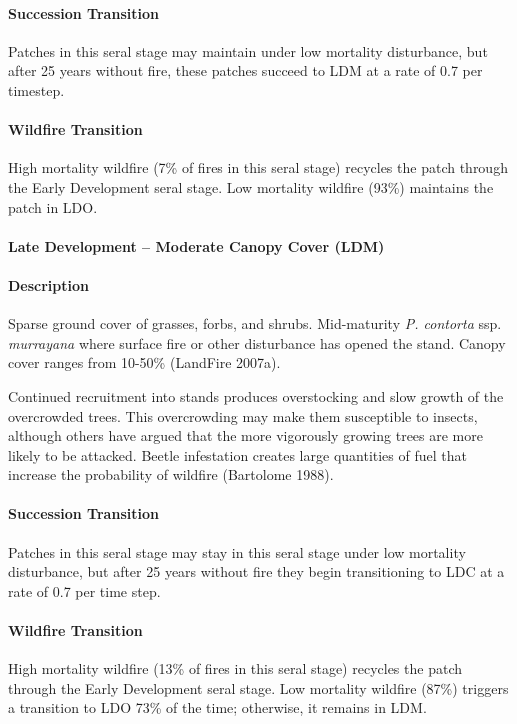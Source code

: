 \paragraph{Succession Transition} Patches in this seral stage may maintain under low mortality disturbance, but after 25 years without fire, these patches succeed to LDM at a rate of 0.7 per timestep.

\paragraph{Wildfire Transition} High mortality wildfire (7\% of fires in this seral stage) recycles the patch through the Early Development seral stage. Low mortality wildfire (93\%) maintains the patch in LDO.

\noindent\hrulefill

\paragraph{Late Development – Moderate Canopy Cover (LDM)}

\paragraph{Description} Sparse ground cover of grasses, forbs, and shrubs. Mid-maturity \emph{P. contorta} ssp. \emph{murrayana} where surface fire or other disturbance has opened the stand. Canopy cover ranges from 10-50\% (LandFire 2007a).

Continued recruitment into stands produces overstocking and slow growth of the overcrowded trees. This overcrowding may make them susceptible to insects, although others have argued that the more vigorously growing trees are more likely to be attacked. Beetle infestation creates large quantities of fuel that increase the probability of wildfire (Bartolome 1988).


\paragraph{Succession Transition} Patches in this seral stage may stay in this seral stage under low mortality disturbance, but after 25 years without fire they begin transitioning to LDC at a rate of 0.7 per time step. 

\paragraph{Wildfire Transition} High mortality wildfire (13\% of fires in this seral stage) recycles the patch through the Early Development seral stage. Low mortality wildfire (87\%) triggers a transition to LDO 73\% of the time; otherwise, it remains in LDM.

